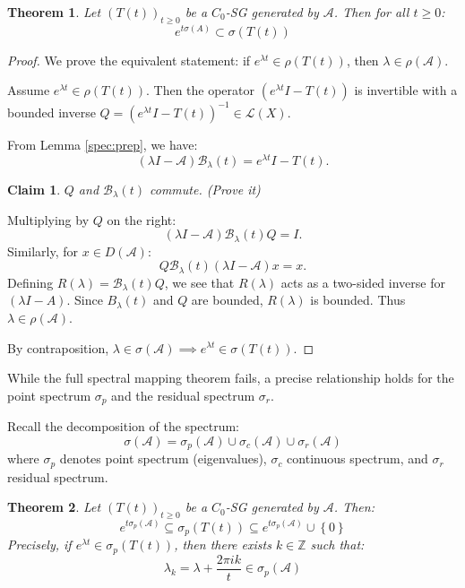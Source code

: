 \documentclass[12pt, oneside]{book}
\newtheorem{theo}{Theorem}[section]
\newtheorem{claim}{Claim}[section]
\newcommand{\A}{\mathscr{A}}
\newcommand{\B}{\mathscr{B}}
\begin{document}
\begin{theo}
	Let $\left(T(t)\right)_{t \ge 0}$ be a $C_0$-SG generated by $\A$. Then for all $t \ge 0$:
	$$
		e^{t \sigma(A)} \subset \sigma(T(t))
	$$
\end{theo}

\begin{proof}
We prove the equivalent statement: if $e^{\lambda t} \in \rho(T(t))$, then $\lambda \in \rho(\A)$.

Assume $e^{\lambda t} \in \rho(T(t))$. Then the operator $(e^{\lambda t} I - T(t))$ is invertible with a bounded inverse $Q = (e^{\lambda t} I - T(t))^{-1} \in \mathcal{L}(X)$.

From Lemma \ref{spec:prep}, we have:
$$
(\lambda I - \A) \B_\lambda(t) = e^{\lambda t} I - T(t).
$$

\begin{claim}
	$Q$ and $\B_{\lambda}(t)$ commute. (Prove it)
\end{claim}
Multiplying by $Q$ on the right:
$$
(\lambda I - \A) \B_\lambda(t) Q = I.
$$
Similarly, for $x \in D(\A)$:
$$
Q \B_\lambda(t) (\lambda I - \A) x = x.
$$
Defining $R(\lambda) = \B_\lambda(t) Q$, we see that $R(\lambda)$ acts as a two-sided inverse for $(\lambda I - A)$. Since $B_\lambda(t)$ and $Q$ are bounded, $R(\lambda)$ is bounded. Thus $\lambda \in \rho(\A)$.

By contraposition, $\lambda \in \sigma(\A) \implies e^{\lambda t} \in \sigma(T(t))$.
\end{proof}

\pagebreak

While the full spectral mapping theorem fails, a precise relationship holds for the point spectrum $\sigma_p$ and the residual spectrum $\sigma_r$.

Recall the decomposition of the spectrum:
$$
\sigma(\A) = \sigma_p(\A) \cup \sigma_c(\A) \cup \sigma_r(\A)
$$
where $\sigma_p$ denotes point spectrum (eigenvalues), $\sigma_c$ continuous spectrum, and $\sigma_r$ residual spectrum.

\begin{theo}
	Let $\left(T(t)\right)_{t \ge 0}$ be a $C_0$-SG generated by $\A$. Then:
$$
e^{t \sigma_p(\A)} \subseteq \sigma_p(T(t)) \subseteq e^{t \sigma_p(\A)} \cup \left\{0\right\}
$$
Precisely, if $e^{\lambda t} \in \sigma_p\left(T(t)\right)$, then there exists $k \in \mathbb{Z}$ such that:
$$
\lambda_k = \lambda + \frac{2\pi i k}{t} \in \sigma_p(\A)
$$
\end{theo}
\end{document}
